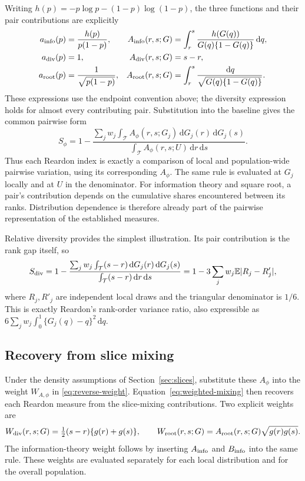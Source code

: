 \documentclass[11pt]{article}
\newcommand{\E}{\mathbb{E}}
\newcommand{\dd}{\,\mathrm{d}}
\newcommand{\T}{\mathcal{T}}
\begin{document}
Writing $h(p)=-p\log p-(1-p)\log(1-p)$, the three functions and their pair contributions are explicitly
\begin{align}
a_{\rm info}(p)&=\frac{h(p)}{p(1-p)}, &
A_{\rm info}(r,s;G)&=\int_r^s\frac{h(G(q))}{G(q)\{1-G(q)\}}\dd q,
\label{eq:info-pair}\\
a_{\rm div}(p)&=1, &
A_{\rm div}(r,s;G)&=s-r,
\label{eq:div-pair}\\
a_{\rm root}(p)&=\frac{1}{\sqrt{p(1-p)}}, &
A_{\rm root}(r,s;G)&=\int_r^s\frac{\dd q}{\sqrt{G(q)\{1-G(q)\}}}.
\label{eq:root-pair}
\end{align}
These expressions use the endpoint convention above; the diversity expression holds for almost every contributing pair. Substitution into the baseline gives the common pairwise form
\begin{equation}
S_\phi=1-
\frac{\sum_jw_j\int_{\T}A_\phi(r,s;G_j)\dd G_j(r)\dd G_j(s)}
{\int_{\T}A_\phi(r,s;U)\dd r\dd s}.
\label{eq:pair-baseline}
\end{equation}
Thus each Reardon index is exactly a comparison of local and population-wide pairwise variation, using its corresponding $A_\phi$. The same rule is evaluated at $G_j$ locally and at $U$ in the denominator. For information theory and square root, a pair's contribution depends on the cumulative shares encountered between its ranks. Distribution dependence is therefore already part of the pairwise representation of the established measures.

Relative diversity provides the simplest illustration. Its pair contribution is the rank gap itself, so
\begin{equation}
S_{\rm div}
=
1-\frac{\sum_jw_j\int_{\T}(s-r)\dd G_j(r)\dd G_j(s)}
{\int_{\T}(s-r)\dd r\dd s}
=
1-3\sum_jw_j\E|R_j-R'_j|,
\label{eq:gini}
\end{equation}
where $R_j,R'_j$ are independent local draws and the triangular denominator is $1/6$. This is exactly Reardon's rank-order variance ratio, also expressible as
$6\sum_jw_j\int_0^1\{G_j(q)-q\}^2\dd q$.


\subsection{Recovery from slice mixing}

Under the density assumptions of Section~\ref{sec:slices}, substitute these $A_\phi$ into the weight $W_{A,\phi}$ in \eqref{eq:reverse-weight}. Equation~\eqref{eq:weighted-mixing} then recovers each Reardon measure from the slice-mixing contributions. Two explicit weights are
\[
W_{\rm div}(r,s;G)=\tfrac12(s-r)\{g(r)+g(s)\},\qquad
W_{\rm root}(r,s;G)=A_{\rm root}(r,s;G)\sqrt{g(r)g(s)}.
\]
The information-theory weight follows by inserting $A_{\rm info}$ and $B_{\rm info}$ into the same rule. These weights are evaluated separately for each local distribution and for the overall population.
\end{document}
